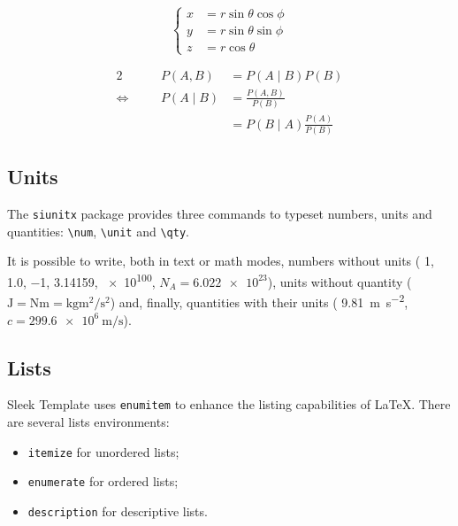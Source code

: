 \documentclass[a4paper, 12pt]{report}
\def\tbs{\textbackslash}
\begin{document}
    \begin{equation}
        \left\{
        \begin{aligned}
            x & = r \sin \theta \cos \phi \\
            y & = r \sin \theta \sin \phi \\
            z & = r \cos \theta
        \end{aligned}
        \right.
    \end{equation}

    \begin{alignat*}{2}
                              & & P(A, B)  & = P(A \mid B) P(B)                        \\
        \Leftrightarrow \quad & & P(A \mid B) & = \frac{P(A, B)}{P(B)}                 \\
                              & &          & = P(B \mid A) \frac{P(A)}{P(B)}
    \end{alignat*}

    \subsection{Units}

    The \texttt{siunitx} package \cite{wright2022siunitx} provides three commands to typeset numbers, units and quantities: \texttt{\tbs{}num}, \texttt{\tbs{}unit} and \texttt{\tbs{}qty}.

    It is possible to write, both in text or math modes, numbers without units (\eg{} \num{1}, \num{1.0}, \num{-1}, \num{3.14159}, \num{e100}, $N_A = \num{6.022e23}$), units without quantity (\eg{} $\unit{\joule} = \unit{\newton\meter} = \unit{\kilogram\meter\squared\per\second\squared}$) and, finally, quantities with their units (\eg{} \qty{9.81}{\meter\per\second\squared}, $c = \qty{299.6e6}{\meter\per\second}$).

    \subsection{Lists}

    Sleek Template uses \texttt{enumitem} to enhance the listing capabilities of \LaTeX{}. There are several lists environments:
    \begin{itemize}[noitemsep]
        \item \texttt{itemize} for unordered lists;
        \item \texttt{enumerate} for ordered lists;
        \item \texttt{description} for descriptive lists.
    \end{itemize}
\end{document}
